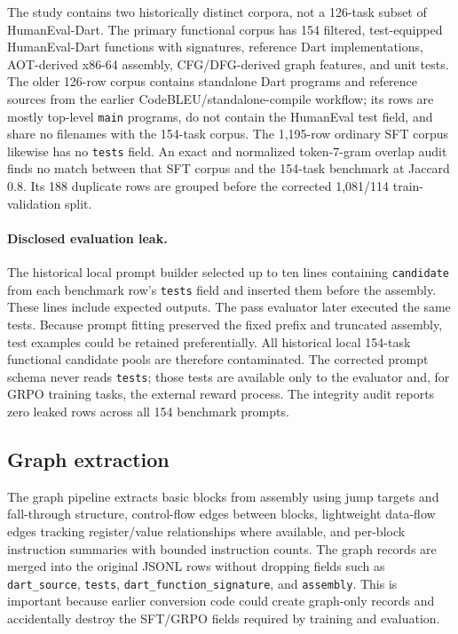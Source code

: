 \documentclass[11pt]{article}
\begin{document}
The study contains two historically distinct corpora, not a 126-task subset of HumanEval-Dart. The primary functional corpus has 154 filtered, test-equipped HumanEval-Dart functions with signatures, reference Dart implementations, AOT-derived x86-64 assembly, CFG/DFG-derived graph features, and unit tests. The older 126-row corpus contains standalone Dart programs and reference sources from the earlier CodeBLEU/standalone-compile workflow; its rows are mostly top-level \texttt{main} programs, do not contain the HumanEval test field, and share no filenames with the 154-task corpus. The 1,195-row ordinary SFT corpus likewise has no \texttt{tests} field. An exact and normalized token-7-gram overlap audit finds no match between that SFT corpus and the 154-task benchmark at Jaccard 0.8. Its 188 duplicate rows are grouped before the corrected 1,081/114 train-validation split.

\paragraph{Disclosed evaluation leak.} The historical local prompt builder selected up to ten lines containing \texttt{candidate} from each benchmark row's \texttt{tests} field and inserted them before the assembly. These lines include expected outputs. The pass evaluator later executed the same tests. Because prompt fitting preserved the fixed prefix and truncated assembly, test examples could be retained preferentially. All historical local 154-task functional candidate pools are therefore contaminated. The corrected prompt schema never reads \texttt{tests}; those tests are available only to the evaluator and, for GRPO training tasks, the external reward process. The integrity audit reports zero leaked rows across all 154 benchmark prompts.

\subsection{Graph extraction}

The graph pipeline extracts basic blocks from assembly using jump targets and fall-through structure, control-flow edges between blocks, lightweight data-flow edges tracking register/value relationships where available, and per-block instruction summaries with bounded instruction counts. The graph records are merged into the original JSONL rows without dropping fields such as \texttt{dart\_source}, \texttt{tests}, \texttt{dart\_function\_signature}, and \texttt{assembly}. This is important because earlier conversion code could create graph-only records and accidentally destroy the SFT/GRPO fields required by training and evaluation.
\end{document}
